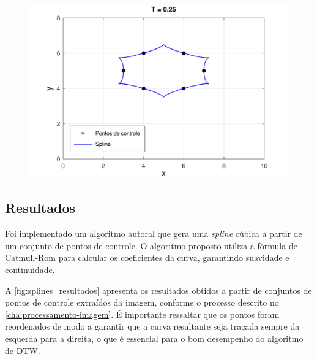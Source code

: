 \begin{figure}[h!]
    \begin{minipage}[b]{0.45\textwidth}
        \centering
        \includegraphics[width=1\linewidth]{fig/cat_rom_t025.png}
        \label{fig:tensao025}
    \end{minipage}
    \label{fig:tensao}
\end{figure}

\subsection{Resultados}

Foi implementado um algoritmo autoral que gera uma \textit{spline} cúbica a partir de um conjunto de pontos de controle. O algoritmo proposto utiliza a fórmula de Catmull-Rom para calcular os coeficientes da curva, garantindo suavidade e continuidade. 

A \autoref{fig:splines_resultados} apresenta os resultados obtidos a partir de conjuntos de pontos de controle extraídos da imagem, conforme o processo descrito no \autoref{cha:processamento-imagem}. É importante ressaltar que os pontos foram reordenados de modo a garantir que a curva resultante seja traçada sempre da esquerda para a direita, o que é essencial para o bom desempenho do algoritmo de DTW.


